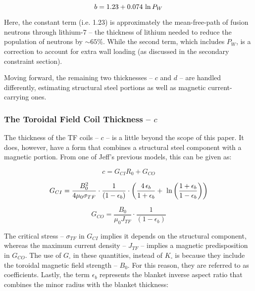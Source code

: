\begin{equation}
	\label{eq:bb}
	b = 1.23 + 0.074 \ \textnormal{ln} \, P_W
\end{equation}

Here, the constant term (i.e. 1.23) is approximately the mean-free-path of fusion neutrons through lithium-7 -- the thickness of lithium needed to reduce the population of neutrons by $\sim 65\%$. While the second term, which includes $P_W$, is a correction to account for extra wall loading (as discussed in the secondary constraint section). 

Moving forward, the remaining two thicknesses -- $c$ and $d$ -- are handled differently, estimating structural steel portions as well as magnetic current-carrying ones.

\subsubsection{The Toroidal Field Coil Thickness -- $c$}

The thickness of the TF coils -- $c$ -- is a little beyond the scope of this paper. It does, however, have a form that combines a structural steel component with a magnetic portion. From one of Jeff's previous models, this can be given as: \cite{minervini}

\begin{equation}
	\label{eq:cc}
	c = G_{CI} R_0 + G_{CO}
\end{equation}

\begin{equation}
	G_{CI} = \frac{B_{0}^2}{ 4 \mu_0 \sigma_{TF} } \cdot \frac{1}{ ( 1 - \epsilon_b )}  \cdot \left( \frac{ 4 \, \epsilon_b}{1+\epsilon_b} + \ \textnormal{ln} \left( \frac{1+\epsilon_b}{1-\epsilon_b} \right) \right) 
\end{equation}

\begin{equation}
	G_{CO} = \frac{B_{0}}{ \mu_0 J_{TF} } \cdot \frac{1}{ ( 1 - \epsilon_b )}
\end{equation}

The critical stress -- $\sigma_{TF}$ in $G_{CI}$ implies it depends on the structural component, whereas the maximum current density -- $J_{TF}$ -- implies a magnetic predisposition in $G_{CO}$. The use of $G_\square$ in these quantities, instead of $K_\square$ is because they include the toroidal magnetic field strength -- $B_0$. For this reason, they are referred to as  coefficients. Lastly, the term $\epsilon_b$ represents the blanket inverse aspect ratio that combines the minor radius with the blanket thickness:

